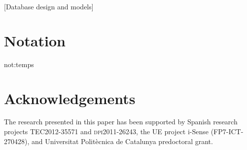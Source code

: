 \documentclass{acm_proc_article-sp}
\begin{document}
\begin{abstract}
  In this paper we define a model for multiresolution time series
  database management systems. These systems store each time series
  lossy compressed by extracting different resolutions and attribute
  aggregations. Then time series are stored compactly, with finite
  capacity and with its temporal attribute managed consistently.

  For many applications it is of primary relevance that database
  systems support time series.  We root our theory firmly on set and
  relational algebra together with some time series analysis specific
  properties that can be problematic when manipulating them.
  Furthermore, we use the time-order acquisition characteristic of
  time series to simplify its treatment by stream-like computations in
  order to achieve fast pre-computed queries and visualisations.
\end{abstract}

[Database design and models]

















\appendix
\section{Notation}
\glsaddall
\gls{not:temps}


\printglossary[type=notation,
]






\section*{Acknowledgements}

The research presented in this paper has been supported by Spanish
research projects \textsc{TEC2012-35571} and \textsc{dpi2011-26243},
the UE project i-Sense ({\small FP7-ICT-270428}), and Universitat
Polit\`{e}cnica de Catalunya predoctoral grant.



\printbibliography[
 title={REFERENCES},
]




\end{document}
